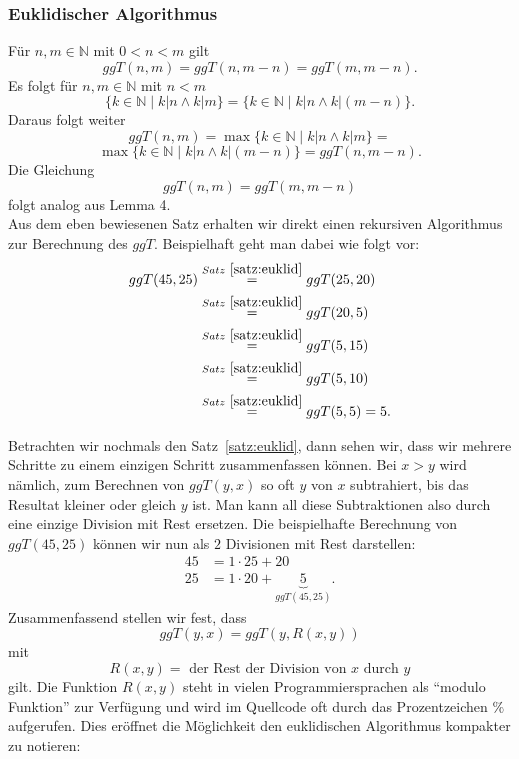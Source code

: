 \subsubsection{Euklidischer Algorithmus}
Für $n,m\in\mathbb{N}$ mit $0<n< m$ gilt
\[
	ggT(n,m)=ggT(n,m-n)=ggT(m,m-n).
\]
Es folgt für $n,m\in\mathbb{N}$ mit $n<m$
\[
	\{k\in\mathbb{N}\mid k|n\wedge k|m\}=\{k\in\mathbb{N}\mid k|n\wedge k|(m-n)\}.
\]
Daraus folgt weiter
\[
	ggT(n,m)=\max\{k\in\mathbb{N}\mid k|n\wedge k|m\}=
\]
\[
	\max\{k\in\mathbb{N}\mid k|n\wedge k|(m-n)\}=ggT(n,m-n).
\]
Die Gleichung
\[
	ggT(n,m)=ggT(m,m-n)
\]
folgt analog aus Lemma 4.
\\
Aus dem eben bewiesenen Satz erhalten wir direkt einen rekursiven Algorithmus zur Berechnung des $ggT$. Beispielhaft geht man dabei wie folgt vor:
\begin{align*}
	ggT(45,25) & \stackrel{Satz~\ref{satz:euklid}}{=}ggT(25,20)  \\
	           & \stackrel{Satz~\ref{satz:euklid}}{=}ggT(20,5)   \\
	           & \stackrel{Satz~\ref{satz:euklid}}{=}ggT(5,15)   \\
	           & \stackrel{Satz~\ref{satz:euklid}}{=}ggT(5,10)   \\
	           & \stackrel{Satz~\ref{satz:euklid}}{=}ggT(5,5)=5.
\end{align*}


Betrachten wir nochmals den Satz~\ref{satz:euklid}, dann sehen wir, dass wir mehrere Schritte zu einem einzigen Schritt zusammenfassen können. Bei $x>y$ wird nämlich, zum Berechnen von $ggT(y,x)$ so oft $y$ von $x$ subtrahiert, bis das Resultat kleiner oder gleich $y$ ist. Man kann all diese Subtraktionen also durch eine einzige Division mit Rest ersetzen.
Die beispielhafte Berechnung von $ggT(45,25)$ können wir nun als $2$ Divisionen mit Rest darstellen:
\begin{align*}
	45 & = 1 \cdot 25 + 20                           \\
	25 & = 1 \cdot 20 + \underbrace{5}_{ggT(45,25)}.
\end{align*}
Zusammenfassend stellen wir fest, dass
\[
	ggT(y,x)=ggT(y,R(x,y))
\]
mit
\[
	R(x,y)=\text{ der Rest der Division von }x\text{ durch }y
\]
gilt. Die Funktion $R(x,y)$ steht in vielen Programmiersprachen als ``modulo Funktion'' zur Verfügung und wird im Quellcode oft durch das Prozentzeichen $\%$ aufgerufen. Dies eröffnet die Möglichkeit den euklidischen Algorithmus kompakter zu notieren:\\

